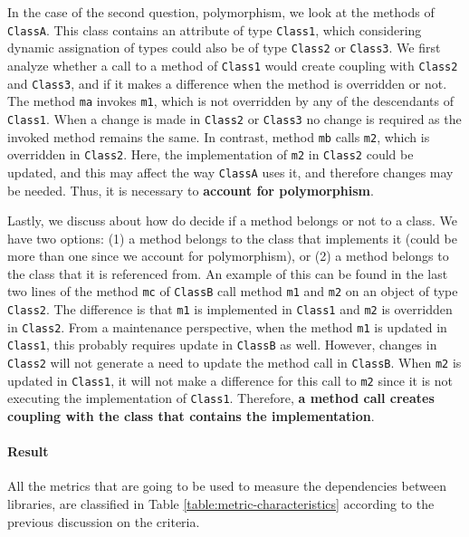 In the case of the second question, polymorphism, we look at the methods of \texttt{ClassA}. This class contains an attribute of type \texttt{Class1}, which considering dynamic assignation of types could also be of type \texttt{Class2} or \texttt{Class3}.
We first analyze whether a call to a method of \texttt{Class1} would create coupling with \texttt{Class2} and \texttt{Class3}, and if it makes a difference when the method is overridden or not. The method \texttt{ma} invokes \texttt{m1}, which is not overridden by any of the descendants of \texttt{Class1}. When a change is made in \texttt{Class2} or \texttt{Class3} no change is required as the invoked method remains the same. In contrast, method \texttt{mb} calls \texttt{m2}, which is overridden in \texttt{Class2}. Here, the implementation of \texttt{m2} in \texttt{Class2} could be updated, and this may affect the way \texttt{ClassA} uses it, and therefore changes may be needed. Thus, it is necessary to \textbf{account for polymorphism}.

Lastly, we discuss about how do decide if a method belongs or not to a class. We have two options: (1) a method belongs to the class that implements it (could be more than one since we account for polymorphism), or (2) a method belongs to the class that it is referenced from. An example of this can be found in the last two lines of the method \texttt{mc} of \texttt{ClassB} call method \texttt{m1} and \texttt{m2} on an object of type \texttt{Class2}. The difference is that \texttt{m1} is implemented in \texttt{Class1} and \texttt{m2} is overridden in \texttt{Class2}. From a maintenance perspective, when the method \texttt{m1} is updated in \texttt{Class1}, this probably requires update in \texttt{ClassB} as well. However, changes in \texttt{Class2} will not generate a need to update the method call in \texttt{ClassB}. When  \texttt{m2} is updated in \texttt{Class1}, it will not make a difference for this call to \texttt{m2} since it is not executing the implementation of \texttt{Class1}. Therefore, \textbf{a method call creates coupling with the class that contains the implementation}.



\paragraph{Result}
All the metrics that are going to be used to measure the dependencies between libraries, are classified in Table \ref{table:metric-characteristics} according to the previous discussion on the criteria.

